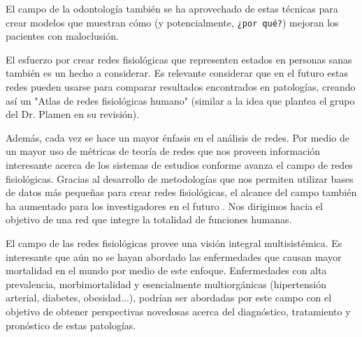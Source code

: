 \documentclass[twoside,twocolumn]{article}
\begin{document}
El campo de la odontología también se ha aprovechado de estas técnicas para crear modelos que muestran cómo (y potencialmente, \texttt{¿por qué?}) mejoran los pacientes con maloclusión\cite{scala2014complex}.

El esfuerzo por crear redes fisiológicas\cite{barajas2021physiological}\cite{barajas2021sex} que representen estados en personas sanas también es un hecho a considerar.
Es relevante considerar que en el futuro estas redes pueden usarse para comparar resultados encontrados en patologías, creando así un "Atlas de redes fisiológicas humano" (similar a la idea que plantea el grupo del Dr. Plamen en su revisión\cite{ivanov2016focus}).

Además, cada vez se hace un mayor énfasis en el análisis de redes.
Por medio de un mayor uso de métricas de teoría de redes que nos proveen información interesante acerca de los sistemas de estudios conforme avanza el campo de redes fisiológicas.
Gracias al desarrollo de metodologías que nos permiten utilizar bases de datos más pequeñas para crear redes fisiológicas, el alcance del campo también ha aumentado para los investigadores en el futuro \cite{cohen2021robust}.
Nos dirigimos hacia el objetivo de una red que integre la totalidad de funciones humanas\cite{barajas2021physiological}.

El campo de las redes fisiológicas provee una visión integral multisistémica.
Es interesante que aún no se hayan abordado las enfermedades que causan mayor mortalidad en el mundo por medio de este enfoque.
Enfermedades con alta prevalencia, morbimortalidad y esencialmente multiorgánicas (hipertensión arterial, diabetes, obesidad...), podrían ser abordadas por este campo con el objetivo de obtener perspectivas novedosas acerca del diagnóstico, tratamiento y pronóstico de estas patologías.
\end{document}
